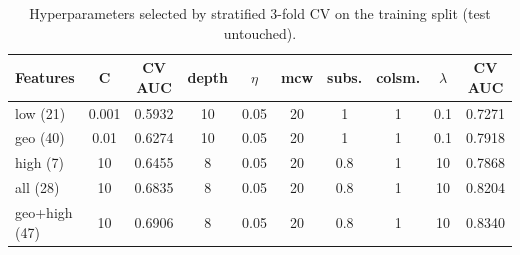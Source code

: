 \begin{table}[!t]
\centering
\caption{Hyperparameters selected by stratified 3-fold CV on the training split (test untouched).}
\label{tab:tuning}
\footnotesize
\setlength{\tabcolsep}{3.5pt}
\begin{tabular}{lccccccccc}
\toprule
Features & C & CV AUC & depth & $\eta$ & mcw & subs. & colsm. & $\lambda$ & CV AUC \\
\midrule
low (21) & 0.001 & 0.5932 & 10 & 0.05 & 20 & 1 & 1 & 0.1 & 0.7271 \\
geo (40) & 0.01 & 0.6274 & 10 & 0.05 & 20 & 1 & 1 & 0.1 & 0.7918 \\
high (7) & 10 & 0.6455 & 8 & 0.05 & 20 & 0.8 & 1 & 10 & 0.7868 \\
all (28) & 10 & 0.6835 & 8 & 0.05 & 20 & 0.8 & 1 & 10 & 0.8204 \\
geo+high (47) & 10 & 0.6906 & 8 & 0.05 & 20 & 0.8 & 1 & 10 & 0.8340 \\
\bottomrule
\end{tabular}
\end{table}

